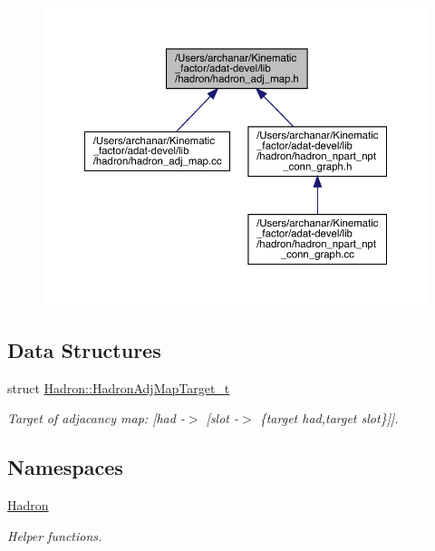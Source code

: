 \begin{figure}[H]
\begin{center}
\leavevmode
\includegraphics[width=350pt]{d6/d5b/adat-devel_2lib_2hadron_2hadron__adj__map_8h__dep__incl}
\end{center}
\end{figure}
\subsection*{Data Structures}
\begin{DoxyCompactItemize}
\item 
struct \mbox{\hyperlink{structHadron_1_1HadronAdjMapTarget__t}{Hadron\+::\+Hadron\+Adj\+Map\+Target\+\_\+t}}
\begin{DoxyCompactList}\small\item\em Target of adjacancy map\+: \mbox{[}had -\/$>$ \mbox{[}slot -\/$>$ \{target had,target slot\}\mbox{]}\mbox{]}. \end{DoxyCompactList}\end{DoxyCompactItemize}
\subsection*{Namespaces}
\begin{DoxyCompactItemize}
\item 
 \mbox{\hyperlink{namespaceHadron}{Hadron}}
\begin{DoxyCompactList}\small\item\em Helper functions. \end{DoxyCompactList}\end{DoxyCompactItemize}
